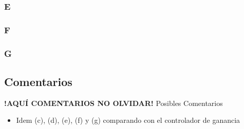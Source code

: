 \FloatBarrier
\subsubsection{E}%

\FloatBarrier
\subsubsection{F}%

\FloatBarrier
\subsubsection{G}%

\FloatBarrier
\subsection{Comentarios}


\textbf{!AQUÍ COMENTARIOS NO OLVIDAR!}
Posibles Comentarios
\begin{itemize}
    \item Idem (c), (d), (e), (f) y (g) comparando con el controlador de ganancia
\end{itemize}
